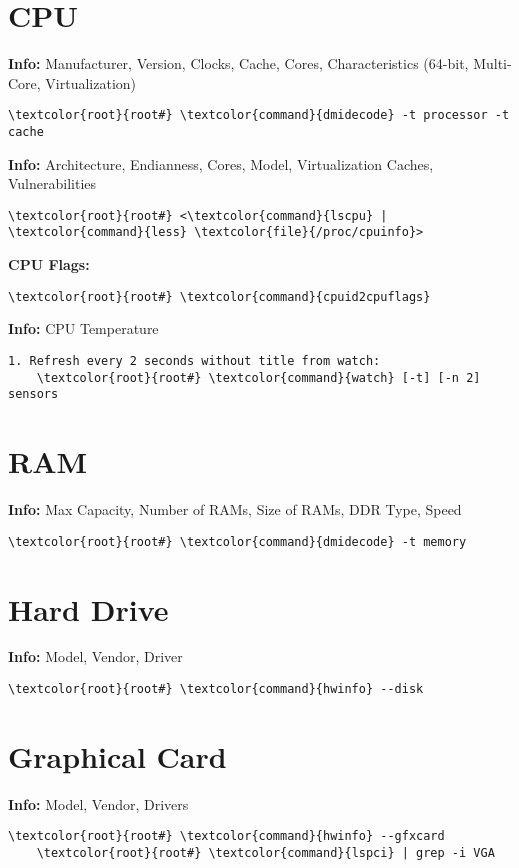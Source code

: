 \documentclass[10pt, a4paper, onecolumn, openany]{book}         %
\begin{document}
\section{CPU}
\textbf{Info:} Manufacturer, Version, Clocks, Cache, Cores, Characteristics (64-bit, Multi-Core, Virtualization)
\begin{Verbatim}[commandchars=\\\{\}]
    \textcolor{root}{root#} \textcolor{command}{dmidecode} -t processor -t cache
\end{Verbatim}
\textbf{Info:} Architecture, Endianness, Cores, Model, Virtualization Caches, Vulnerabilities
\begin{Verbatim}[commandchars=\\\{\}]
   \textcolor{root}{root#} <\textcolor{command}{lscpu} | \textcolor{command}{less} \textcolor{file}{/proc/cpuinfo}>
\end{Verbatim}
\textbf{CPU Flags:}
\begin{Verbatim}[commandchars=\\\{\}]
    \textcolor{root}{root#} \textcolor{command}{cpuid2cpuflags}
\end{Verbatim}
\textbf{Info:} CPU Temperature
\begin{Verbatim}[commandchars=\\\{\}]
1. Refresh every 2 seconds without title from watch:
    \textcolor{root}{root#} \textcolor{command}{watch} [-t] [-n 2] sensors
\end{Verbatim}

\section{RAM}
\textbf{Info:} Max Capacity, Number of RAMs, Size of RAMs, DDR Type, Speed
\begin{Verbatim}[commandchars=\\\{\}]
    \textcolor{root}{root#} \textcolor{command}{dmidecode} -t memory
\end{Verbatim}

\section{Hard Drive}
\textbf{Info:} Model, Vendor, Driver
\begin{Verbatim}[commandchars=\\\{\}]
    \textcolor{root}{root#} \textcolor{command}{hwinfo} --disk
\end{Verbatim}

\section{Graphical Card}
\textbf{Info:} Model, Vendor, Drivers
\begin{Verbatim}[commandchars=\\\{\}]
    \textcolor{root}{root#} \textcolor{command}{hwinfo} --gfxcard
    \textcolor{root}{root#} \textcolor{command}{lspci} | grep -i VGA
\end{Verbatim}
\end{document}
